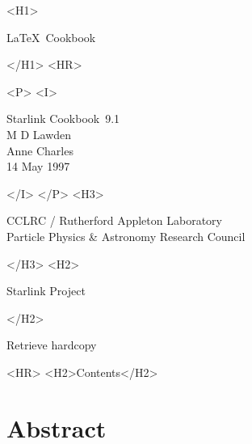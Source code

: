 \documentclass[twoside,11pt]{article}
\newcommand{\stardoccategory}  {Starlink Cookbook}
\newcommand{\stardocsource}    {sc\stardocnumber}
\newcommand{\stardocnumber}    {9.1}
\newcommand{\stardocauthors}   {M D Lawden\\
                                Anne Charles}
\newcommand{\stardocdate}      {14 May 1997}
\newcommand{\stardoctitle}     {\LaTeX\ Cookbook}
\newcommand{\htmladdnormallink}[2]{#1}
\newcommand{\htmladdimg}[1]{}
\newcommand{\htmlref}[2]{#1}
\newcommand{\htmladdtonavigation}[1]{}
\newcommand{\xlabel}[1]{}
\begin{document}
\begin{htmlonly}
   \xlabel{}
   \begin{rawhtml} <H1> \end{rawhtml}
      \stardoctitle
   \begin{rawhtml} </H1> <HR> \end{rawhtml}


   \begin{rawhtml} <P> <I> \end{rawhtml}
   \stardoccategory\ \stardocnumber \\
   \stardocauthors \\
   \stardocdate
   \begin{rawhtml} </I> </P> <H3> \end{rawhtml}
      \htmladdnormallink{CCLRC / Rutherford Appleton Laboratory}
                        {http://www.cclrc.ac.uk} \\
      \htmladdnormallink{Particle Physics \& Astronomy Research Council}
                        {http://www.pparc.ac.uk} \\
   \begin{rawhtml} </H3> <H2> \end{rawhtml}
      \htmladdnormallink{Starlink Project}{http://www.starlink.ac.uk/}
   \begin{rawhtml} </H2> \end{rawhtml}
   \htmladdnormallink{\htmladdimg{source.gif} Retrieve hardcopy}
      {http://www.starlink.ac.uk/cgi-bin/hcserver?\stardocsource}\\

  \label{stardoccontents}
  \begin{rawhtml}
    <HR>
    <H2>Contents</H2>
  \end{rawhtml}
  \htmladdtonavigation{\htmlref{\htmladdimg{contents_motif.gif}}
        {stardoccontents}}

  \section{\xlabel{abstract}Abstract}

\end{htmlonly}
\end{document}

